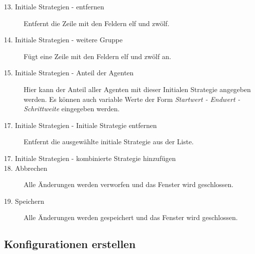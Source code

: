 \begin{description}
\item[13. Initiale Strategien - entfernen] Entfernt die Zeile mit den Feldern elf und zwölf.

\item[14. Initiale Strategien - weitere Gruppe] Fügt eine Zeile mit den Feldern elf und zwölf an.

\item[15. Initiale Strategien - Anteil der Agenten] Hier kann der Anteil aller Agenten mit dieser Initialen Strategie angegeben werden. Es können auch variable Werte der Form \textit{Startwert - Endwert - Schrittweite} eingegeben werden.

\item[17. Initiale Strategien - Initiale Strategie entfernen] Entfernt die ausgewählte initiale Strategie aus der Liste. 

\item[17. Initiale Strategien - kombinierte Strategie hinzufügen] 

\item[18. Abbrechen] Alle Änderungen werden verworfen und das Fenster wird geschlossen.

\item[19. Speichern] Alle Änderungen werden gespeichert und das Fenster wird geschlossen.

\end{description}




\subsection{Konfigurationen erstellen}

